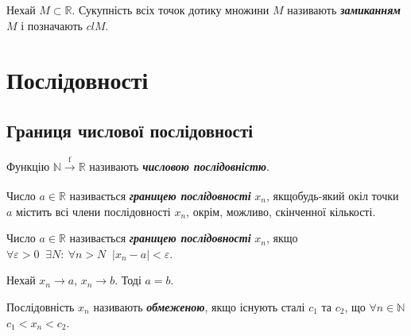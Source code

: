 \begin{definition} 
       Нехай $M \subset \mathbb{R}$. Сукупність всіх точок дотику множини $M$ називають \textcolor{NavyBlue}{\textbf{\textit{замиканням}}}\;$M$ \newline і позначають $clM$.
\end{definition}

\section{\Large{Послідовності}}
\subsection{\large{Границя числової послідовності}} 
\begin{definition} 
        Функцію $\mathbb{N} \xrightarrow[\text{}]{\text{f}}
        \mathbb{R} $ називають \textcolor{NavyBlue}{\textbf{\textit{числовою послідовністю}}}.
\end{definition}
\begin{definition}[топологічне]
        Число $a \in \mathbb{R}$ називається \textcolor{NavyBlue}{\textbf{\textit{границею послідовності}}} $x_n$, якщо\newline  будь-який окіл точки $a$ містить всі члени послідовності $x_n$, окрім, можливо, скінченної кількості.
\end{definition}

\begin{definition}[кванторне]
        Число $a \in \mathbb{R}$ називається \textcolor{NavyBlue}{\textbf{\textit{границею послідовності}}} $x_n$, якщо  \newline \;  $\forall \varepsilon > 0 \; \; \exists N: \ \forall n > N \; \; \left| x_n - a \right| < \varepsilon$.
\end{definition}

\begin{theorem}
        Нехай $x_n \to a$, $x_n \to b$. Тоді $a = b$.  
\end{theorem}

\begin{definition} 
       Послідовність $x_n$ називають \textcolor{NavyBlue}{\textbf{\textit{обмеженою}}}, якщо існують сталі $c_1$ та $c_2$, що   $\forall n \in \mathbb{N}$  $c_1 < x_n < c_2$.
\end{definition}

